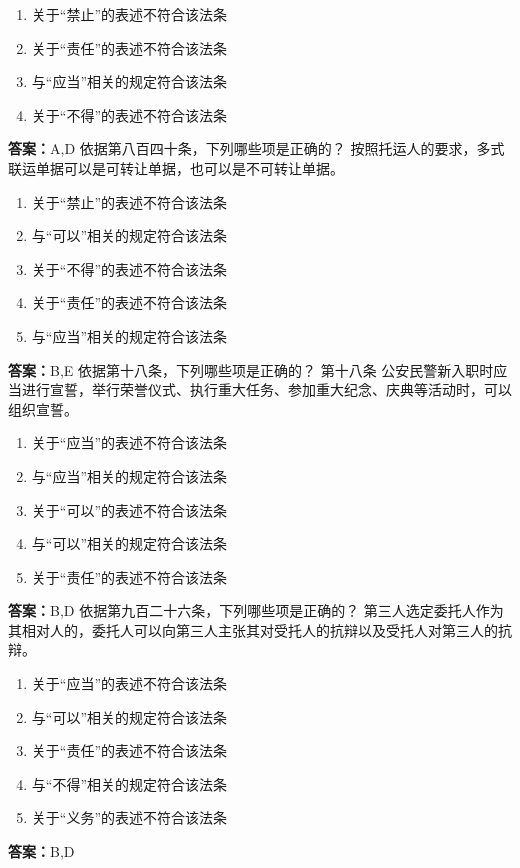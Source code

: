 \documentclass[12pt]{ctexart}
\begin{document}
\begin{questions}
\begin{enumerate}[label=\Alph*.]
\item 关于“禁止”的表述不符合该法条
\item 关于“责任”的表述不符合该法条
\item 与“应当”相关的规定符合该法条
\item 关于“不得”的表述不符合该法条
\end{enumerate}
\ifprintanswers\par\textbf{答案：}A,D\fi
\question 依据第八百四十条，下列哪些项是正确的？
按照托运人的要求，多式联运单据可以是可转让单据，也可以是不可转让单据。
\begin{enumerate}[label=\Alph*.]
\item 关于“禁止”的表述不符合该法条
\item 与“可以”相关的规定符合该法条
\item 关于“不得”的表述不符合该法条
\item 关于“责任”的表述不符合该法条
\item 与“应当”相关的规定符合该法条
\end{enumerate}
\ifprintanswers\par\textbf{答案：}B,E\fi
\question 依据第十八条，下列哪些项是正确的？
第十八条 公安民警新入职时应当进行宣誓，举行荣誉仪式、执行重大任务、参加重大纪念、庆典等活动时，可以组织宣誓。
\begin{enumerate}[label=\Alph*.]
\item 关于“应当”的表述不符合该法条
\item 与“应当”相关的规定符合该法条
\item 关于“可以”的表述不符合该法条
\item 与“可以”相关的规定符合该法条
\item 关于“责任”的表述不符合该法条
\end{enumerate}
\ifprintanswers\par\textbf{答案：}B,D\fi
\question 依据第九百二十六条，下列哪些项是正确的？
第三人选定委托人作为其相对人的，委托人可以向第三人主张其对受托人的抗辩以及受托人对第三人的抗辩。
\begin{enumerate}[label=\Alph*.]
\item 关于“应当”的表述不符合该法条
\item 与“可以”相关的规定符合该法条
\item 关于“责任”的表述不符合该法条
\item 与“不得”相关的规定符合该法条
\item 关于“义务”的表述不符合该法条
\end{enumerate}
\ifprintanswers\par\textbf{答案：}B,D\fi

\end{questions}
\end{document}
